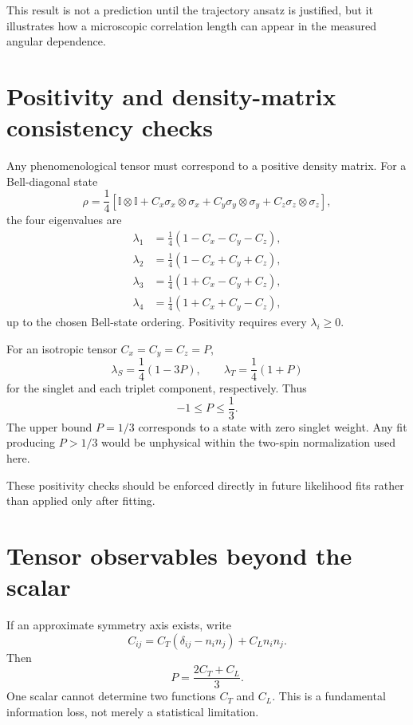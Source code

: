 \documentclass[11pt]{article}
\newcommand{\Id}{\mathbb I}
\begin{document}
This result is not a prediction until the trajectory ansatz is justified, but it illustrates how a microscopic correlation length can appear in the measured angular dependence.

\section{Positivity and density-matrix consistency checks}

Any phenomenological tensor must correspond to a positive density matrix. For a Bell-diagonal state
\begin{equation}
\rho
=\frac14\left[
\Id\otimes\Id+
C_x\sigma_x\otimes\sigma_x+
C_y\sigma_y\otimes\sigma_y+
C_z\sigma_z\otimes\sigma_z
\right],
\end{equation}
the four eigenvalues are
\begin{align}
\lambda_1&=\frac14(1-C_x-C_y-C_z),\\
\lambda_2&=\frac14(1-C_x+C_y+C_z),\\
\lambda_3&=\frac14(1+C_x-C_y+C_z),\\
\lambda_4&=\frac14(1+C_x+C_y-C_z),
\end{align}
up to the chosen Bell-state ordering. Positivity requires every $\lambda_i\ge0$.

For an isotropic tensor $C_x=C_y=C_z=P$,
\begin{equation}
\lambda_S=\frac14(1-3P),
\qquad
\lambda_T=\frac14(1+P)
\end{equation}
for the singlet and each triplet component, respectively. Thus
\begin{equation}
-1\le P\le\frac13.
\end{equation}
The upper bound $P=1/3$ corresponds to a state with zero singlet weight. Any fit producing $P>1/3$ would be unphysical within the two-spin normalization used here.

These positivity checks should be enforced directly in future likelihood fits rather than applied only after fitting.

\section{Tensor observables beyond the scalar}

If an approximate symmetry axis exists, write
\begin{equation}
C_{ij}=C_T(\delta_{ij}-n_in_j)+C_Ln_in_j.
\end{equation}
Then
\begin{equation}
P=\frac{2C_T+C_L}{3}.
\end{equation}
One scalar cannot determine two functions $C_T$ and $C_L$. This is a fundamental information loss, not merely a statistical limitation.
\end{document}
